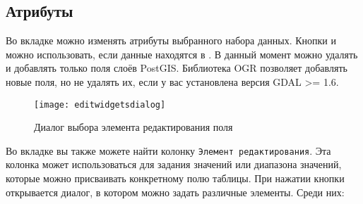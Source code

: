\subsection{Атрибуты}\label{label_attributes}

Во вкладке  можно изменять атрибуты выбранного набора данных.
Кнопки  и
 можно использовать, если
данные находятся в .
В данный момент можно удалять и добавлять только поля слоёв PostGIS.
Библиотека OGR позволяет добавлять новые поля, но не удалять их, если
у вас установлена версия GDAL >= 1.6.


\begin{figure}[ht]
   \centering
   \texttt{[image: editwidgetsdialog]}
   \caption{Диалог выбора элемента редактирования поля
\wincaption}\label{fig:editwidget}
\end{figure}

Во вкладке  вы также можете найти колонку
\texttt{Элемент редактирования}. Эта колонка может использоваться для
задания значений или диапазона значений, которые можно присваивать
конкретному полю таблицы. При нажатии кнопки 
открывается диалог, в котором можно задать различные элементы. Среди них:

